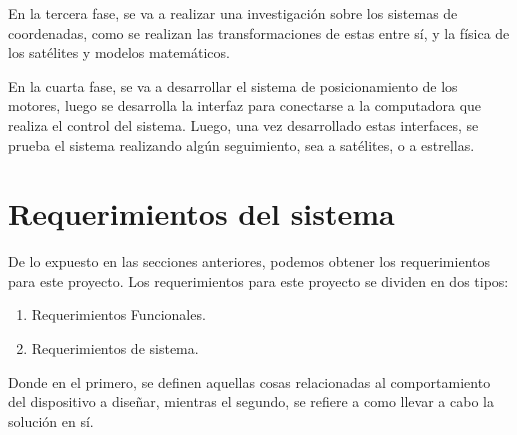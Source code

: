 En la tercera fase, se va a realizar una investigación sobre los sistemas de coordenadas, como se realizan las transformaciones de estas entre sí, y la física de los satélites y modelos matemáticos.

En la cuarta fase, se va a desarrollar el sistema de posicionamiento de los motores, luego se desarrolla la interfaz para conectarse a la computadora que realiza el control del sistema. Luego, una vez desarrollado estas interfaces, se prueba el sistema realizando algún seguimiento, sea a satélites, o a estrellas.  



















\section{ Requerimientos del sistema} \label{req_sist}

De lo expuesto en las secciones anteriores, podemos obtener los requerimientos para este proyecto. Los requerimientos para este proyecto se dividen en dos tipos:  
\begin{enumerate}
	\item Requerimientos Funcionales.  
	\item Requerimientos de sistema. 
\end{enumerate} 
Donde en el primero, se definen aquellas cosas relacionadas al comportamiento del dispositivo a diseñar, mientras el segundo, se refiere a como llevar a cabo la solución en sí. 


\renewcommand{\arraystretch}{1.5}

